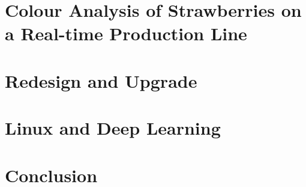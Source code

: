 \documentclass[fleqn,twoside]{article}
\begin{document}
\newpage

\section{Colour Analysis of Strawberries on a Real-time Production Line}
\label{sec:paper_2}






\newpage

\section{Redesign and Upgrade}
\label{sec:III}














\newpage

\section{Linux and Deep Learning}
\label{sec:IV}














\newpage

\section{Conclusion}
\end{document}
